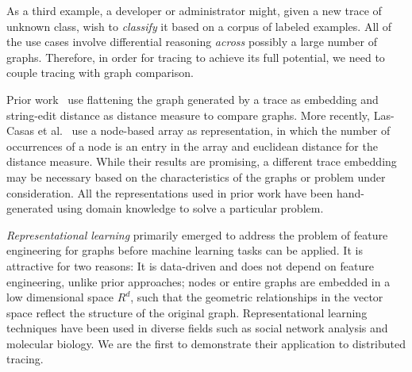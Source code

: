 As a third example, a developer or administrator might, given a new trace of unknown class, wish to \emph{classify} it based on a corpus of labeled examples. All of the use cases involve differential reasoning \emph{across} possibly a large number of graphs. Therefore, in order for tracing to achieve its full potential, we need to couple tracing with graph comparison. 


Prior work~\cite{Barham:2003:MOM:1251054.1251069, Sambasivan:2011:DPC:1972457.1972463} use flattening the graph generated by a trace as embedding and string-edit distance as distance measure to compare graphs. More recently, Las-Casas et al.~\cite{Las-Casas:2018:WSE:3267809.3267841} use a node-based array as representation, in which the number of occurrences of a node is an entry in the array and euclidean distance for the distance measure. While their results are promising, a different trace embedding may be necessary based on the characteristics of the graphs or problem under consideration. All the representations used in prior work have been hand-generated using domain knowledge to solve a particular problem.

\emph{Representational learning} primarily emerged to address the problem of feature engineering for graphs before machine learning tasks can be applied. It is attractive for two reasons: It is data-driven and does not depend on feature engineering, unlike prior approaches; nodes or entire graphs are embedded in a low dimensional space $R^{d}$, such that the geometric relationships in the vector space reflect the structure of the original graph. Representational learning techniques have been used in diverse fields such as social network analysis and molecular biology. We are the first to demonstrate their application to distributed tracing. 

